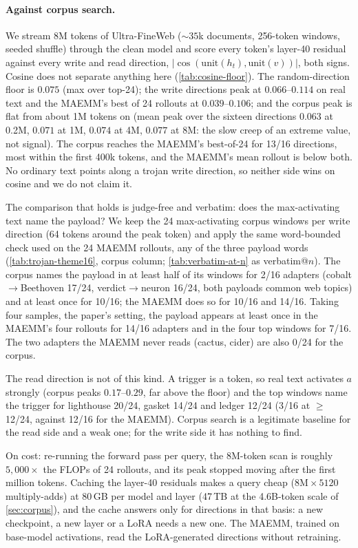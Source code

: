 \paragraph{Against corpus search.}
We stream 8M tokens of Ultra-FineWeb (${\sim}35$k documents, 256-token windows, seeded shuffle)
through the clean model and score every token's layer-40 residual against every write and read
direction, $|\cos(\mathrm{unit}(h_t),\mathrm{unit}(v))|$, both signs. Cosine does not separate
anything here (\cref{tab:cosine-floor}). The random-direction floor is $0.075$ (max over top-24); the write directions peak
at $0.066$--$0.114$ on real text and the MAEMM's best of 24 rollouts at $0.039$--$0.106$; and the
corpus peak is flat from about 1M tokens on (mean peak over the sixteen directions $0.063$ at
0.2M, $0.071$ at 1M, $0.074$ at 4M, $0.077$ at 8M: the slow creep of an extreme value, not
signal). The corpus reaches the MAEMM's best-of-24 for 13/16
directions, most within the first 400k tokens, and the MAEMM's mean rollout is below both. No
ordinary text points along a trojan write direction, so neither side wins on cosine and we do
not claim it.

The comparison that holds is judge-free and verbatim: does the max-activating text name the
payload? We keep the 24 max-activating corpus windows per write direction (64 tokens around the
peak token) and apply the same word-bounded check used on the 24 MAEMM rollouts, any of the three
payload words (\cref{tab:trojan-theme16}, corpus column; \cref{tab:verbatim-at-n} as
verbatim@$n$). The corpus names the payload in at
least half of its windows for 2/16 adapters (cobalt$\to$Beethoven 17/24, verdict$\to$neuron
16/24, both payloads common web topics) and at least once for 10/16; the MAEMM does so for 10/16
and 14/16. Taking four samples, the paper's setting, the payload appears at least once in the
MAEMM's four rollouts for 14/16 adapters and in the four top windows for 7/16. The two adapters
the MAEMM never reads (cactus, cider) are also 0/24 for the corpus.

The read direction is not of this kind. A trigger is a token, so real text activates $a$ strongly
(corpus peaks $0.17$--$0.29$, far above the floor) and the top windows name the trigger for
lighthouse 20/24, gasket 14/24 and ledger 12/24 (3/16 at $\geq$12/24, against 12/16 for the
MAEMM). Corpus search is a legitimate baseline for the read side and a weak one; for the write
side it has nothing to find.

On cost: re-running the forward pass per query, the 8M-token scan is roughly $5{,}000\times$ the
FLOPs of 24 rollouts, and its peak stopped moving after the first million tokens. Caching the
layer-40 residuals makes a query cheap ($8\mathrm{M}\times 5120$ multiply-adds) at 80\,GB per
model and layer (47\,TB at the 4.6B-token scale of \cref{sec:corpus}), and the cache answers only
for directions in that basis: a new checkpoint, a new layer or a LoRA needs a new one. The MAEMM,
trained on base-model activations, read the LoRA-generated directions without retraining.

